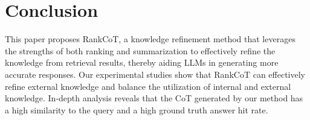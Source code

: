 \section{Conclusion}
This paper proposes RankCoT, a knowledge refinement method that leverages the strengths of both ranking and summarization to effectively refine the knowledge from retrieval results, thereby aiding LLMs in generating more accurate responses. Our experimental studies show that RankCoT can effectively refine external knowledge and balance the utilization of internal and external knowledge. In-depth analysis reveals that the CoT generated by our method has a high similarity to the query and a high ground truth answer hit rate. 
